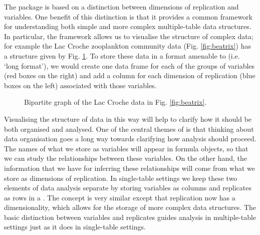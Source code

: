 \documentclass[a4paper]{report}
\begin{document}
\begin{article}
The  package is based on a distinction between dimensions of replication and variables.  One benefit of this distinction is that it provides a common framework for understanding both simple and more complex multiple-table data structures.  In particular, the framework allows us to visualise the structure of complex data; for example the Lac Croche zooplankton community data (Fig. \ref{fig:beatrix}) \citep{CantinEtAl2011} has a structure given by Fig. \ref{fig:bipartitebeatrix}.  To store these data in a format amenable to  (i.e. `long format'), we would create one data frame for each of the groups of variables (red boxes on the right) and add a column for each dimension of replication (blue boxes on the left) associated with those variables.

\begin{figure}
\vspace{0.1cm}
\caption{Bipartite graph of the Lac Croche data in Fig. \ref{fig:beatrix}.} 
\label{fig:bipartitebeatrix}
\end{figure}

Visualising the structure of data in this way will help to clarify how it should be both organised and analysed.  One of the central themes of  is that thinking about data organisation goes a long way towards clarifying how analysis should proceed.  The names of what we store as variables will appear in formula objects, so that we can study the relationships between these variables.  On the other hand, the information that we have for inferring these relationships will come from what we store as dimensions of replication.  In single-table settings we keep these two elements of data analysis separate by storing variables as columns and replicates as rows in a .  The  concept is very similar except that replication now has a dimensionality, which allows for the storage of more complex data structures.  The basic distinction between variables and replicates guides analysis in multiple-table settings just as it does in single-table settings.


\end{article}
\end{document}
